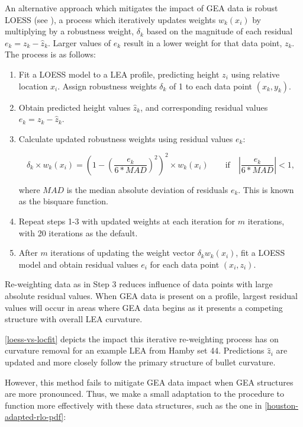\documentclass[12pt]{article}
\begin{document}
An alternative approach which mitigates the impact of GEA data is robust
LOESS (see \cite{Cleveland1}), a process which iteratively updates
weights \(w_k(x_i)\) by multiplying by a robustness weight, \(\delta_k\)
based on the magnitude of each residual \(e_k = z_k - \widehat{z}_k\).
Larger values of \(e_k\) result in a lower weight for that data point,
\(z_k\). The process is as follows:

\begin{enumerate}

\item Fit a LOESS model to a LEA profile, predicting height $z_i$ using relative location $x_i$. Assign robustness weights $\delta_k$ of 1 to each data point $(x_k, y_k)$.  
\item Obtain predicted height values $\widehat{z}_k$, and corresponding residual values $e_k = z_k - \widehat{z}_k$. 
\item Calculate updated robustness weights using residual values $e_k$: 

$$\delta_k \times w_k(x_i) =\left(1 - \left(\frac{e_k}{6*MAD}\right)^2\right)^2 \times w_k(x_i) \quad \quad \mbox{if}\quad \left|\frac{e_k}{6*MAD} \right| < 1,$$

where $MAD$ is the median absolute deviation of residuals $e_k$. This is known as the bisquare function.  
\item Repeat steps 1-3 with updated weights at each iteration for $m$ iterations, with 20 iterations as the default.  
\item After $m$ iterations of updating the weight vector $\delta_k w_k(x_i)$, fit a LOESS model and obtain residual values $e_i$ for each data point $(x_i, z_i)$.  

\end{enumerate}

Re-weighting data as in Step 3 reduces influence of data points with
large absolute residual values. When GEA data is present on a profile,
largest residual values will occur in areas where GEA data begins as it
presents a competing structure with overall LEA curvature.

\autoref{loess-vs-locfit} depicts the impact this iterative re-weighting
process has on curvature removal for an example LEA from Hamby set 44.
Predictions \(\widehat{z}_i\) are updated and more closely follow the
primary structure of bullet curvature.

However, this method fails to mitigate GEA data impact when GEA
structures are more pronounced. Thus, we make a small adaptation to the
procedure to function more effectively with these data structures, such
as the one in \autoref{houston-adapted-rlo-pdf}:
\end{document}
